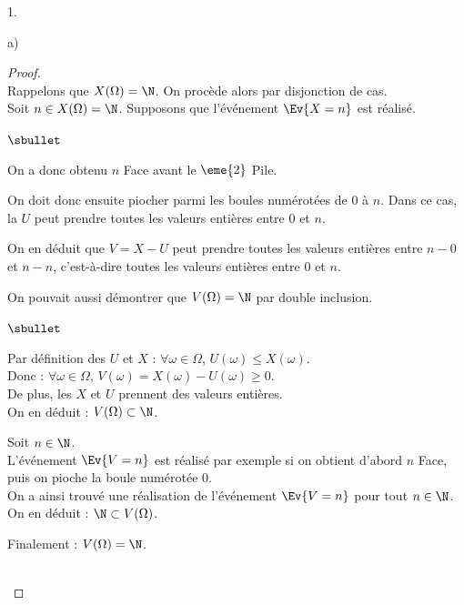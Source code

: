 \documentclass[11pt]{article}%
\begin{document}
\begin{noliste}{1.}
\begin{noliste}{a)}
    \begin{proof}~\\
      Rappelons que $X(\Omega)=\N$. On procède alors par disjonction de 
      cas.\\
      Soit $n\in X(\Omega)= \N$. Supposons que l'événement $\Ev{X=n}$ 
      est réalisé.
      \begin{noliste}{$\sbullet$}
        \item On a donc obtenu $n$ Face avant le $\eme{2}$ Pile.
        \item On doit donc ensuite piocher parmi les boules 
        numérotées de $0$ à $n$. Dans ce cas, la \var $U$ peut 
	prendre toutes les valeurs entières entre $0$ et $n$.
	\item On en déduit que $V=X-U$ peut prendre toutes les 
	valeurs entières entre $n-0$ et $n-n$, c'est-à-dire toutes 
	les valeurs entières entre $0$ et $n$.
      \end{noliste}
      
      \begin{remark}
        On pouvait aussi démontrer que $V(\Omega) = \N$ par double 
        inclusion.
        \begin{noliste}{$\sbullet$}
          \item Par définition des \var $U$ et $X$ : $\forall \omega 
          \in \Omega$, $U(\omega) \leq X(\omega)$.\\
          Donc : $\forall \omega \in \Omega$, $V(\omega) = 
          X(\omega) - U(\omega) \geq 0$.\\
          De plus, les \var $X$ et $U$ prennent des valeurs entières.\\
          On en déduit : $V(\Omega) \subset \N$.
          
          \item Soit $n \in \N$.\\
          L'événement $\Ev{V=n}$ est réalisé par exemple si on 
          obtient d'abord $n$ Face, puis on pioche la boule numérotée 
	  $0$.\\
	  On a ainsi trouvé une réalisation de l'événement $\Ev{V=n}$
	  pour tout $n\in \N$.\\
	  On en déduit : $\N \subset V(\Omega)$.
        \end{noliste}
        Finalement : $V(\Omega) = \N$.
      \end{remark}~\\[-1.4cm]
    \end{proof}
    

\end{noliste}
\end{noliste}
\end{document}
